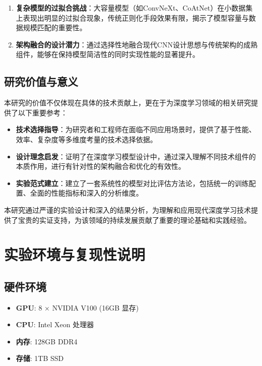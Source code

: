 \documentclass[a4paper]{article}
\begin{document}
\begin{description}
\begin{enumerate}
    \item \textbf{复杂模型的过拟合挑战}：大容量模型（如ConvNeXt、CoAtNet）在小数据集上表现出明显的过拟合现象，传统正则化手段效果有限，揭示了模型容量与数据规模匹配的重要性。

    \item \textbf{架构融合的设计潜力}：通过选择性地融合现代CNN设计思想与传统架构的成熟组件，能够在保持模型简洁性的同时实现性能的显著提升。
\end{enumerate}

\subsection{研究价值与意义}
本研究的价值不仅体现在具体的技术贡献上，更在于为深度学习领域的相关研究提供了以下重要参考：

\begin{itemize}
    \item \textbf{技术选择指导}：为研究者和工程师在面临不同应用场景时，提供了基于性能、效率、复杂度等多维度考量的技术选择依据。
    
    \item \textbf{设计理念启发}：证明了在深度学习模型设计中，通过深入理解不同技术组件的本质作用，进行有针对性的架构融合和优化的有效性。
    
    \item \textbf{实验范式建立}：建立了一套系统性的模型对比评估方法论，包括统一的训练配置、全面的性能指标和深入的分析维度。
\end{itemize}

本研究通过严谨的实验设计和深入的结果分析，为理解和应用现代深度学习技术提供了宝贵的实证支持，为该领域的持续发展贡献了重要的理论基础和实践经验。




\appendix

\section{实验环境与复现性说明}
\label{app:reproducibility}

\subsection{硬件环境}
\begin{itemize}
    \item \textbf{GPU}: 8 × NVIDIA V100 (16GB 显存)
    \item \textbf{CPU}: Intel Xeon 处理器
    \item \textbf{内存}: 128GB DDR4
    \item \textbf{存储}: 1TB SSD
\end{itemize}


\end{description}
\end{document}
